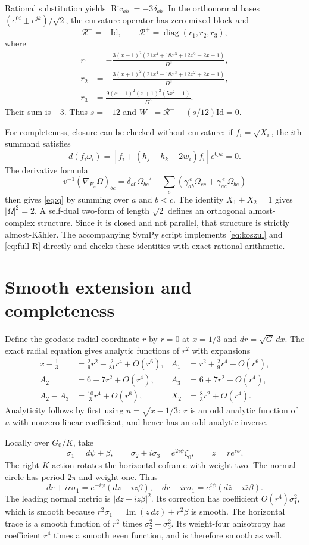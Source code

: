 \documentclass[11pt]{article}
\DeclareMathOperator{\Ric}{Ric}
\newcommand{\Id}{\mathrm{Id}}
\begin{document}
Rational substitution yields $\Ric_{ab}=-3\delta_{ab}$.
In the orthonormal bases $(e^{0i}\pm e^{jk})/\sqrt2$, the curvature
operator has zero mixed block and
\begin{equation}\label{eq:Rblocks}
 \mathcal R^-=-\Id,
 \qquad\mathcal R^+=\operatorname{diag}(r_1,r_2,r_3),
\end{equation}
where
\begin{align*}
 r_1&=-\frac{3(x-1)^2(21x^4+18x^3+12x^2-2x-1)}{D^3},\\
 r_2&=-\frac{3(x+1)^2(21x^4-18x^3+12x^2+2x-1)}{D^3},\\
 r_3&=\frac{9(x-1)^2(x+1)^2(5x^2-1)}{D^3}.
\end{align*}
Their sum is $-3$. Thus $s=-12$ and
$W^-=\mathcal R^--(s/12)\Id=0$.

For completeness, closure can be checked without curvature:
if $f_i=\sqrt{X_i}$, the $i$th summand satisfies
\[
 d(f_i\omega_i)=
 [\dot f_i+(h_j+h_k-2w_i)f_i]e^{0jk}=0.
\]
The derivative formula
\[
 v^{-1}(\nabla_{E_a}\Omega)_{bc}
 =\delta_{a0}\Omega_{bc}'-
 \sum_e(\gamma_{ab}^{\ e}\Omega_{ec}
        +\gamma_{ac}^{\ e}\Omega_{be})
\]
then gives \eqref{eq:q} by summing over $a$ and $b<c$.
The identity $X_1+X_2=1$ gives $|\Omega|^2=2$.
A self-dual two-form of length $\sqrt2$ defines an orthogonal
almost-complex structure. Since it is closed and not parallel, that
structure is strictly almost-K\"ahler. The accompanying SymPy script
implements \eqref{eq:koszul} and \eqref{eq:full-R} directly and checks
these identities with exact rational arithmetic.

\section{Smooth extension and completeness}

Define the geodesic radial coordinate $r$ by $r=0$ at $x=1/3$ and
$dr=\sqrt G\,dx$. The exact radial equation gives analytic functions
of $r^2$ with expansions
\begin{align*}
 x-\tfrac13&=\tfrac29r^2-\tfrac2{81}r^4+O(r^6),&
 A_1&=r^2+\tfrac29r^4+O(r^6),\\
 A_2&=6+7r^2+O(r^4),&A_3&=6+7r^2+O(r^4),\\
 A_2-A_3&=\tfrac{10}{3}r^4+O(r^6),&X_2&=\tfrac83r^2+O(r^4).
\end{align*}
Analyticity follows by first using $u=\sqrt{x-1/3}$: $r$ is an odd
analytic function of $u$ with nonzero linear coefficient, and hence has
an odd analytic inverse.

Locally over $G_0/K$, take
\[
 \sigma_1=d\psi+\beta,\qquad
 \sigma_2+i\sigma_3=e^{2i\psi}\zeta_0,\qquad z=re^{i\psi}.
\]
The right $K$-action rotates the horizontal coframe with weight two.
The normal circle has period $2\pi$ and weight one. Thus
\[
 dr+ir\sigma_1=e^{-i\psi}(dz+iz\beta),\quad
 dr-ir\sigma_1=e^{i\psi}(d\bar z-i\bar z\beta).
\]
The leading normal metric is $|dz+iz\beta|^2$. Its correction has
coefficient $O(r^4)\sigma_1^2$, which is smooth because
$r^2\sigma_1=\operatorname{Im}(\bar z\,dz)+r^2\beta$ is smooth.
The horizontal trace is a smooth function of $r^2$ times
$\sigma_2^2+\sigma_3^2$. Its weight-four anisotropy has coefficient
$r^4$ times a smooth even function, and is therefore smooth as well.
\end{document}
